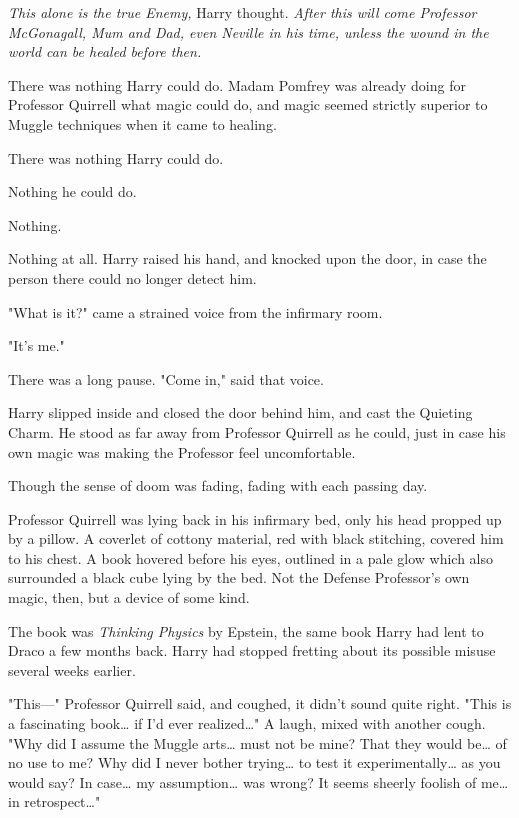 \emph{This alone is the true Enemy,} Harry thought. \emph{After this will come 
Professor McGonagall, Mum and Dad, even Neville in his time, unless the wound 
in the world can be healed before then.}

There was nothing Harry could do. Madam Pomfrey was already doing for Professor 
Quirrell what magic could do, and magic seemed strictly superior to Muggle 
techniques when it came to healing.

There was nothing Harry could do.

Nothing he could do.

Nothing.

Nothing at all.
\sbreak
Harry raised his hand, and knocked upon the door, in case the person there 
could no longer detect him.

"What is it?" came a strained voice from the infirmary room.

"It's me."

There was a long pause. "Come in," said that voice.

Harry slipped inside and closed the door behind him, and cast the Quieting 
Charm. He stood as far away from Professor Quirrell as he could, just in case 
his own magic was making the Professor feel uncomfortable.

Though the sense of doom was fading, fading with each passing day.

Professor Quirrell was lying back in his infirmary bed, only his head propped 
up by a pillow. A coverlet of cottony material, red with black stitching, 
covered him to his chest. A book hovered before his eyes, outlined in a pale 
glow which also surrounded a black cube lying by the bed. Not the Defense 
Professor's own magic, then, but a device of some kind.

The book was \emph{Thinking Physics} by Epstein, the same book Harry had lent 
to Draco a few months back. Harry had stopped fretting about its possible 
misuse several weeks earlier.

"This---" Professor Quirrell said, and coughed, it didn't sound quite right. 
"This is a fascinating book{\ldots} if I'd ever realized{\ldots}" A laugh, 
mixed with another cough. "Why did I assume the Muggle arts{\ldots} must not be 
mine? That they would be{\ldots} of no use to me? Why did I never bother 
trying{\ldots} to test it experimentally{\ldots} as you would say? In 
case{\ldots} my assumption{\ldots} was wrong? It seems sheerly foolish of 
me{\ldots} in retrospect{\ldots}"

